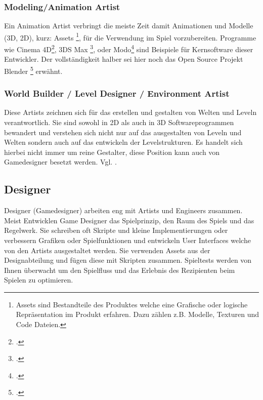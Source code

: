\documentclass[pagesize, paper=a4, fontsize=12pt,titlepage=true, headings=small, headnosepline, abstractoff, liststotoc, nochapterprefix, plainheadsepline, twoside]{scrreprt}
\begin{document}
\subsubsection{Modeling/Animation Artist}
Ein Animation Artist verbringt die meiste Zeit damit Animationen und Modelle (3D, 2D), kurz: Assets \footnote{Assets sind Bestandteile des Produktes welche eine Grafische oder logische Repräsentation im Produkt erfahren. Dazu zählen z.B. Modelle, Texturen und Code Dateien.}, für die Verwendung im Spiel vorzubereiten. Programme wie Cinema 4D\footcite{MaxonC4d2014}, 3DS Max \footcite{AutodeskMax2014}, oder Modo\footcite{FoundryModo2014} sind Beispiele für Kernsoftware dieser Entwickler. Der vollständigkeit halber sei hier noch das Open Source Projekt Blender \footcite{Blender2015} erwähnt.

\subsubsection{World Builder / Level Designer / Environment Artist}
Diese Artists zeichnen sich für das erstellen und gestalten von Welten und Leveln verantwortlich. Sie sind sowohl in 2D als auch in 3D Softwareprogrammen bewandert und verstehen sich nicht nur auf das ausgestalten von Leveln und Welten sondern auch auf das entwickeln der Levelstrukturen. Es handelt sich hierbei nicht immer um reine Gestalter, diese Position kann auch von Gamedesigner besetzt werden. Vgl. \autocite[S. 24]{Chandler2006}.

\subsection{Designer}
Designer (Gamedesigner) arbeiten eng mit Artists und Engineers zusammen. Meist Entwicklen Game Designer das Spielprinzip, den Raum des Spiels und das Regelwerk. Sie schreiben oft Skripte und kleine Implementierungen oder verbessern Grafiken oder Spielfunktionen und entwickeln User Interfaces welche von den Artists ausgestaltet werden. Sie verwenden Assets aus der Designabteilung und fügen diese mit Skripten zusammen. Spieltests werden von Ihnen überwacht um den Spielfluss und das Erlebnis des Rezipienten beim Spielen zu optimieren.
\end{document}
